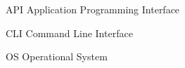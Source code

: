 \begin{siglas}
  \item[API] Application Programming Interface
  \item[CLI] Command Line Interface
  \item[OS] Operational System
\end{siglas}

